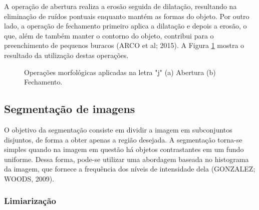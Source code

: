 A operação de abertura realiza a erosão seguida de dilatação, resultando na eliminação de ruídos pontuais enquanto mantém as formas do objeto. Por outro lado, a operação de fechamento primeiro aplica a dilatação e depois a erosão, o que, além de também manter o contorno do objeto, contribui para o preenchimento de pequenos buracos (ARCO et al; 2015). A Figura \ref{img:morph_op} mostra o resultado da utilização destas operações. 

\begin{figure}[H]
\centering
    \caption{\label{img:morph_op} Operações morfológicas aplicadas na letra "j" (a) Abertura (b) Fechamento.}
\end{figure}

\subsection{Segmentação de imagens}

O objetivo da segmentação consiste em dividir a imagem em subconjuntos disjuntos, de forma a obter apenas a região desejada. A segmentação torna-se simples quando na imagem em questão há objetos contrastantes em um fundo uniforme. Dessa forma, pode-se utilizar uma abordagem baseada no histograma da imagem, que fornece a frequência dos níveis de intensidade dela (GONZALEZ; WOODS, 2009).

\subsubsection{Limiarização}


